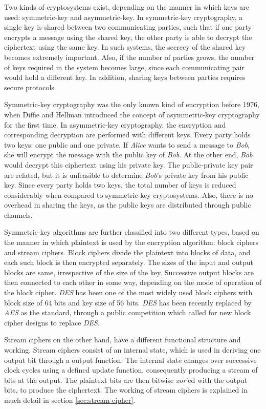 
Two kinds of cryptosystems exist, depending on the manner in which keys are used: symmetric-key and asymmetric-key. In symmetric-key cryptography, a single key is shared between two communicating parties, such that if one party encrypts a message using the shared key, the other party is able to decrypt the ciphertext using the same key. In such systems, the secrecy of the shared key becomes extremely important. Also, if the number of parties grows, the number of keys required in the system becomes large, since each communicating pair would hold a different key. In addition, sharing keys between parties requires secure protocols. 

Symmetric-key cryptography was the only known kind of encryption before 1976, when Diffie and Hellman introduced the concept of asymmetric-key cryptography \cite{diffie1976ndc} for the first time. In asymmetric-key cryptography, the encryption and corresponding decryption are performed with different keys. Every party holds two keys: one public and one private. If \emph{Alice} wants to send a message to \emph{Bob}, she will encrypt the message with the public key of \emph{Bob}. At the other end, \emph{Bob} would decrypt this ciphertext using his private key. The public-private key pair are related, but it is unfeasible to determine \emph{Bob}'s private key from his public key. Since every party holds two keys, the total number of keys is reduced considerably when compared to symmetric-key cryptosystems. Also, there is no overhead in sharing the keys, as the public keys are distributed through public channels.

Symmetric-key algorithms are further classified into two different types, based on the manner in which plaintext is used by the encryption algorithm: block ciphers and stream ciphers. Block ciphers divide the plaintext into blocks of data, and each such block is then encrypted separately. The sizes of the input and output blocks are same, irrespective of the size of the key. Successive output blocks are then connected to each other in some way, depending on the mode of operation of the block cipher. \emph{DES} has been one of the most widely used block ciphers with block size of 64 bits and key size of 56 bits. \emph{DES} has been recently replaced by \emph{AES} as the standard, through a public competition which called for new block cipher designs to replace \emph{DES}.

Stream ciphers on the other hand, have a different functional structure and working. Stream ciphers consist of an internal state, which is used in deriving one output bit through a output function. The internal state changes over successive clock cycles using a defined update function, consequently producing a stream of bits at the output. The plaintext bits are then bitwise \emph{xor}'ed with the output bits, to produce the ciphertext. The working of stream ciphers is explained in much detail in section \ref{sec:stream-cipher}. 

